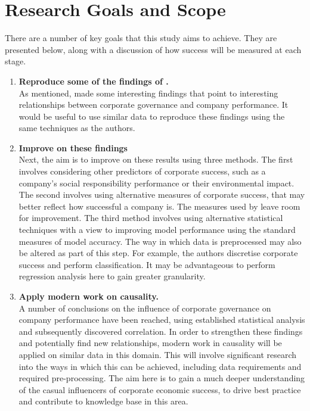 \section{Research Goals and Scope}{\label{RGAS}}
{There are a number of key goals that this study aims to achieve. They are presented below, along with a discussion of how success will be measured at each stage.
\begin{enumerate}
\item{\bf {Reproduce some of the findings of \cite{moldovan2015learning}}.}\\
{As mentioned, \cite{moldovan2015learning} made some interesting findings that point to interesting relationships between corporate governance and company performance. It would be useful to use similar data to reproduce these findings using the same techniques as the authors.}
\item{\bf {Improve on these findings}}\\
Next, the aim is to improve on these results using three methods. The first involves considering other predictors of corporate success, such as a company's social responsibility performance or their environmental impact. The second involves using alternative measures of corporate success, that may better reflect how successful a company is. The measures used by \cite{moldovan2015learning} leave room for improvement. The third method involves using alternative statistical techniques with a view to improving model performance using the standard measures of model accuracy. The way in which data is preprocessed may also be altered as part of this step. For example, the authors discretise corporate success and perform classification. It may be advantageous to perform regression analysis here to gain greater granularity.
\item{\bf {Apply modern work on causality.}}\\
{A number of conclusions on the influence of corporate governance on company performance have been reached, using established statistical analysis and subsequently discovered correlation. In order to strengthen these findings and potentially find new relationships, modern work in causality will be applied on similar data in this domain. This will involve significant research into the ways in which this can be achieved, including data requirements and required pre-processing. The aim here is to gain a much deeper understanding of the casual influencers of corporate economic success, to drive best practice and contribute to knowledge base in this area. }
\end{enumerate}
}
